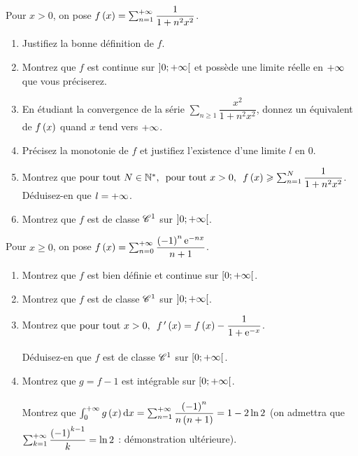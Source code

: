 \begin{exoss}
Pour \(x>0\), on pose \(f\left(x\right)=\sum_{n=1}^{+\infty}\dfrac{1}{1+n^2x^2}\).

\begin{enumerate}
    \item Justifiez la bonne définition de \(f\). \\
    \item Montrez que \(f\) est continue sur \(\left]0;+\infty\right[\) et possède une limite réelle en \(+\infty\) que vous préciserez. \\
    \item En étudiant la convergence de la série \(\sum_{n\geq1}\dfrac{x^2}{1+n^2x^2}\), donnez un équivalent de \(f\left(x\right)\) quand \(x\) tend vers \(+\infty\). \\
    \item Précisez la monotonie de \(f\) et justifiez l'existence d'une limite \(l\) en \(0\). \\
    \item Montrez que \(\quantifs{\tpt N\in\Ns;\tpt x>0}f\paren{x}\geq\sum_{n=1}^N\dfrac{1}{1+n^2x^2}\). Déduisez-en que \(l=+\infty\). \\
    \item Montrez que \(f\) est de classe \(\mathscr{C}^{1}\) sur \(\left]0;+\infty\right[\).
\end{enumerate}
\end{exoss}

\begin{exoss}
Pour \(x\geq0\), on pose \(f\left(x\right)=\sum_{n=0}^{+\infty}\dfrac{\left(-1\right)^n\mathrm{e}^{-nx}}{n+1}\).

\begin{enumerate}
    \item Montrez que \(f\) est bien définie et continue sur \(\left[0;+\infty\right[\). \\
    \item Montrez que \(f\) est de classe \(\mathscr{C}^{1}\) sur \(\left]0;+\infty\right[\). \\
    \item Montrez que \(\quantifs{\tpt x>0}f\prim\paren{x}=f\paren{x}-\dfrac{1}{1+\e{-x}}\). \\\\ Déduisez-en que \(f\) est de classe \(\mathscr{C}^{1}\) sur \(\left[0;+\infty\right[\). \\
    \item Montrez que \(g=f-1\) est intégrable sur \(\left[0;+\infty\right[\). \\\\ Montrez que \(\int_0^{\pinf}g\paren{x}\odif{x}=\sum_{n=1}^{\pinf}\dfrac{\paren{-1}^n}{n\paren{n+1}}=1-2\ln 2\) (on admettra que \(\sum_{k=1}^{+\infty}\dfrac{\left(-1\right)^{k-1}}{k}=\ln 2\) : démonstration ultérieure).
\end{enumerate}
\end{exoss}

